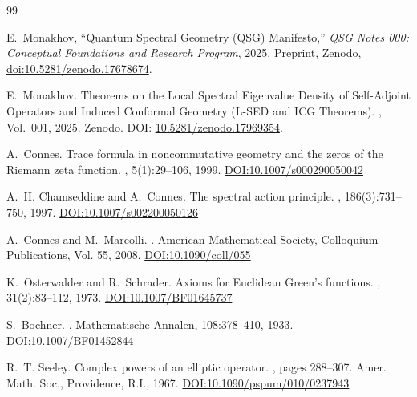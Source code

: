 \documentclass{article}
\numberwithin{equation}{section}
\theoremstyle{plain}
\theoremstyle{definition}
\theoremstyle{remark}
\begin{document}

\begin{thebibliography}{99}
\raggedright

E.~Monakhov,
``Quantum Spectral Geometry (QSG) Manifesto,''
\emph{QSG Notes 000: Conceptual Foundations and Research Program},
2025.
Preprint, Zenodo,
\href{https://doi.org/10.5281/zenodo.17678674}{doi:10.5281/zenodo.17678674}.

E.~Monakhov.
\newblock Theorems on the Local Spectral Eigenvalue Density of Self-Adjoint Operators and Induced Conformal Geometry (L-SED and ICG Theorems).
, Vol.~001, 2025.
\newblock Zenodo.
\newblock DOI: \href{https://doi.org/10.5281/zenodo.17969354}{10.5281/zenodo.17969354}.



A.~Connes.
\newblock Trace formula in noncommutative geometry and the zeros of the Riemann zeta function.
, 5(1):29--106, 1999.
\href{https://doi.org/10.1007/s000290050042}{DOI:10.1007/s000290050042}

A.~H. Chamseddine and A.~Connes.
\newblock The spectral action principle.
, 186(3):731--750, 1997.
\href{https://doi.org/10.1007/s002200050126}{DOI:10.1007/s002200050126}


A.~Connes and M.~Marcolli.
.
\newblock American Mathematical Society, Colloquium Publications, Vol. 55, 2008.
\href{https://doi.org/10.1090/coll/055}{DOI:10.1090/coll/055}

K.~Osterwalder and R.~Schrader.
\newblock Axioms for Euclidean Green's functions.
, 31(2):83--112, 1973.
\href{https://doi.org/10.1007/BF01645737}{DOI:10.1007/BF01645737}


S.~Bochner.
.
\newblock Mathematische Annalen, 108:378--410, 1933.
\href{https://doi.org/10.1007/BF01452844}{DOI:10.1007/BF01452844}


R.~T. Seeley.
\newblock Complex powers of an elliptic operator.
, pages 288--307.
\newblock Amer. Math. Soc., Providence, R.I., 1967.
\href{https://doi.org/10.1090/pspum/010/0237943}{DOI:10.1090/pspum/010/0237943}



\end{thebibliography}
\end{document}
